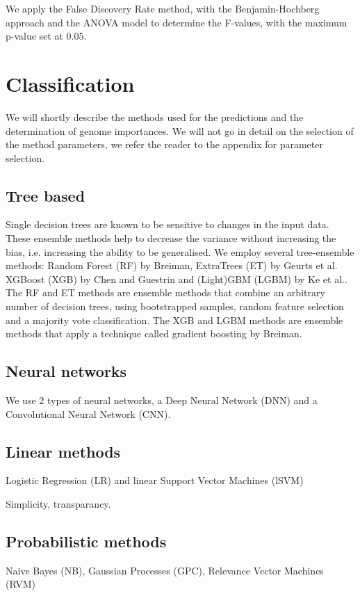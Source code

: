 \documentclass[a4paper,10pt]{article}
\begin{document}
We apply the False Discovery Rate method, with the Benjamin-Hochberg approach and the ANOVA model
to determine the F-values, with the maximum p-value set at $0.05$. %
%
\section{Classification}
%
We will shortly describe the methods used for the predictions and the determination of genome importances.
We will not go in detail on the selection of the method parameters, we refer the reader to the appendix for 
parameter selection.

\subsection{Tree based}

Single decision trees are known to be sensitive to changes in the input data. These ensemble methods 
help to decrease the variance without increasing the bias, i.e. increasing the ability to be generalised.
We employ several tree-ensemble methods: Random Forest (RF) by Breiman\cite{Breiman2001}, ExtraTrees (ET) by Geurts et al.\cite{Geurts2006} 
XGBoost (XGB) by Chen and Guestrin\cite{Chen2016} and (Light)GBM (LGBM) by Ke et al.\cite{Ke2017}.
The RF and ET methods are ensemble methods that combine an arbitrary number of decision trees, using bootstrapped samples,
random feature selection and a majority vote classification. The XGB and LGBM methods are ensemble methods 
that apply a technique called gradient boosting by Breiman\cite{Breiman1997}.
%
\subsection{Neural networks}

We use $2$ types of neural networks, a Deep Neural Network (DNN) and a Convolutional Neural Network (CNN). 

\subsection{Linear methods}

Logistic Regression (LR) and linear Support Vector Machines (lSVM)

Simplicity, transparancy.

\subsection{Probabilistic methods}
%
Naive Bayes (NB), Gaussian Processes (GPC), Relevance Vector Machines (RVM)
\end{document}
